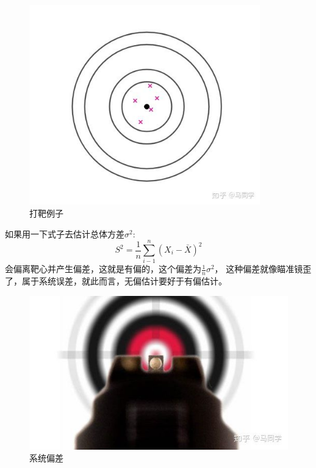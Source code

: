 \documentclass{article}
\begin{document}
\begin{figure}
    \centering
    \includegraphics[width=10cm]{figure3.jpg}
    \caption{打靶例子}
\end{figure}
如果用一下式子去估计总体方差$\sigma^2$:
\begin{equation}
    S^2=\frac{1}{n}\sum\limits_{i-1}^n{(X_i-\bar{X})^2}
\end{equation}
会偏离靶心并产生偏差，这就是有偏的，这个偏差为$\frac{1}{n}\sigma^2$，
这种偏差就像瞄准镜歪了，属于系统误差，就此而言，无偏估计要好于有偏估计。
\begin{figure}
    \centering
    \includegraphics[width=15cm]{figure4.jpg}
    \caption{系统偏差}
\end{figure}
\end{document}
